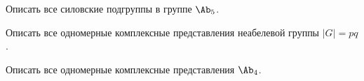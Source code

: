 \documentclass[a4paper]{article}
\begin{document}
\begin{problem}
Описать все силовские подгруппы в группе $\Ab_5$.
\end{problem}
\begin{problem}
Описать все одномерные комплексные представления неабелевой группы $|G|=pq$.
\end{problem}
\begin{problem}
Описать все одномерные комплексные представления $\Ab_4$.
\end{problem}
\end{document}
